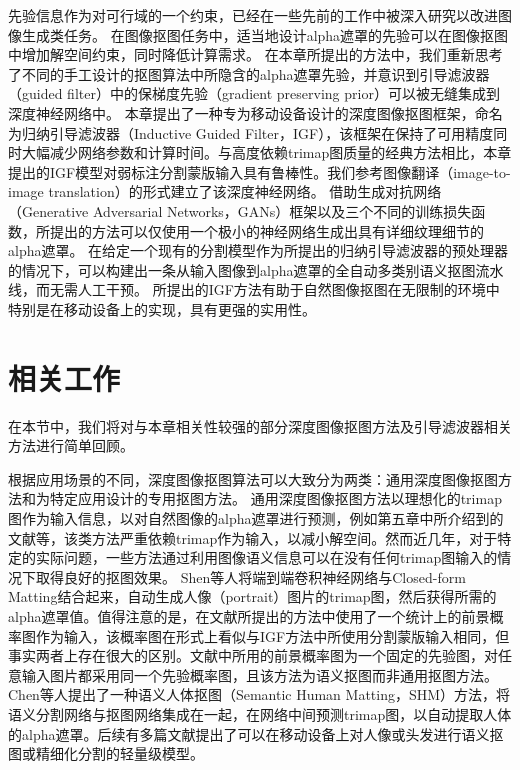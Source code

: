先验信息作为对可行域的一个约束，已经在一些先前的工作中被深入研究以改进图像生成类任务\cite{ulyanov2018deep}。
在图像抠图任务中，适当地设计alpha遮罩的先验可以在图像抠图中增加解空间约束，同时降低计算需求。
在本章所提出的方法中，我们重新思考了不同的手工设计的抠图算法中所隐含的alpha遮罩先验，并意识到引导滤波器（guided filter）\cite{he2010guided}中的保梯度先验（gradient preserving prior）可以被无缝集成到深度神经网络中。
本章提出了一种专为移动设备设计的深度图像抠图框架，命名为归纳引导滤波器（Inductive Guided Filter，IGF），该框架在保持了可用精度同时大幅减少网络参数和计算时间。与高度依赖trimap图质量的经典方法相比，本章提出的IGF模型对弱标注分割蒙版输入具有鲁棒性。我们参考图像翻译（image-to-image translation）的形式建立了该深度神经网络。
借助生成对抗网络（Generative Adversarial Networks，GANs）框架以及三个不同的训练损失函数，所提出的方法可以仅使用一个极小的神经网络生成出具有详细纹理细节的alpha遮罩。
在给定一个现有的分割模型作为所提出的归纳引导滤波器的预处理器的情况下，可以构建出一条从输入图像到alpha遮罩的全自动多类别语义抠图流水线，而无需人工干预。
所提出的IGF方法有助于自然图像抠图在无限制的环境中特别是在移动设备上的实现，具有更强的实用性。

\section{相关工作}
在本节中，我们将对与本章相关性较强的部分深度图像抠图方法及引导滤波器相关方法进行简单回顾。

根据应用场景的不同，深度图像抠图算法可以大致分为两类：通用深度图像抠图方法和为特定应用设计的专用抠图方法。
通用深度图像抠图方法以理想化的trimap图作为输入信息，以对自然图像的alpha遮罩进行预测，例如第五章中所介绍到的文献\parencite{cho2019deep,xu2017deep,lutz2018alphagan,cai2019disentangled,lu2019indices,hou2019context,samplenet}等，该类方法严重依赖trimap作为输入，以减小解空间。然而近几年，对于特定的实际问题，一些方法通过利用图像语义信息可以在没有任何trimap图输入的情况下取得良好的抠图效果。
Shen等人\cite{shen2016deep}将端到端卷积神经网络与Closed-form Matting\cite{levin2008closed}结合起来，自动生成人像（portrait）图片的trimap图，然后获得所需的alpha遮罩值。值得注意的是，在文献\parencite{shen2016deep}所提出的方法中使用了一个统计上的前景概率图作为输入，该概率图在形式上看似与IGF方法中所使用分割蒙版输入相同，但事实两者上存在很大的区别。文献\parencite{shen2016deep}中所用的前景概率图为一个固定的先验图，对任意输入图片都采用同一个先验概率图，且该方法为语义抠图而非通用抠图方法。
Chen等人\cite{chen2018semantic}提出了一种语义人体抠图（Semantic Human Matting，SHM）方法，将语义分割网络与抠图网络集成在一起，在网络中间预测trimap图，以自动提取人体的alpha遮罩。后续有多篇文献\cite{zhu2017fast,levinshtein2018real,chen2019boundary}提出了可以在移动设备上对人像或头发进行语义抠图或精细化分割的轻量级模型。

